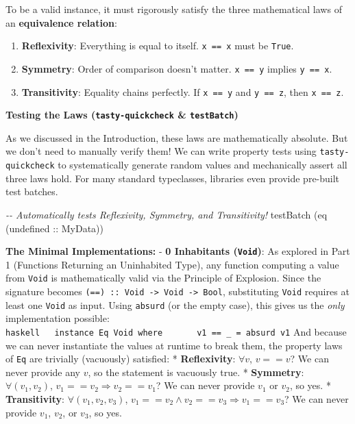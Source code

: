 \documentclass[
]{article}
\newenvironment{Shaded}{}{}
\newcommand{\CommentTok}[1]{\textcolor[rgb]{0.38,0.63,0.69}{\textit{#1}}}
\newcommand{\DataTypeTok}[1]{\textcolor[rgb]{0.56,0.13,0.00}{#1}}
\newcommand{\FunctionTok}[1]{\textcolor[rgb]{0.02,0.16,0.49}{#1}}
\newcommand{\NormalTok}[1]{#1}
\newcommand{\OtherTok}[1]{\textcolor[rgb]{0.00,0.44,0.13}{#1}}
\providecommand{\tightlist}{%
  \setlength{\itemsep}{0pt}\setlength{\parskip}{0pt}}
\begin{document}
To be a valid instance, it must rigorously satisfy the three
mathematical laws of an \textbf{equivalence relation}:

\begin{enumerate}
\def\labelenumi{\arabic{enumi}.}
\tightlist
\item
  \textbf{Reflexivity}: Everything is equal to itself. \texttt{x\ ==\ x}
  must be \texttt{True}.
\item
  \textbf{Symmetry}: Order of comparison doesn't matter.
  \texttt{x\ ==\ y} implies \texttt{y\ ==\ x}.
\item
  \textbf{Transitivity}: Equality chains perfectly. If \texttt{x\ ==\ y}
  and \texttt{y\ ==\ z}, then \texttt{x\ ==\ z}.
\end{enumerate}

\textbf{Testing the Laws (\texttt{tasty-quickcheck} \&
\texttt{testBatch})}

As we discussed in the Introduction, these laws are mathematically
absolute. But we don't need to manually verify them! We can write
property tests using \texttt{tasty-quickcheck} to systematically
generate random values and mechanically assert all three laws hold. For
many standard typeclasses, libraries even provide pre-built test
batches.

\begin{Shaded}
\begin{Highlighting}[]
\CommentTok{{-}{-} Automatically tests Reflexivity, Symmetry, and Transitivity!}
\NormalTok{testBatch (eq (}\FunctionTok{undefined}\OtherTok{ ::} \DataTypeTok{MyData}\NormalTok{))}
\end{Highlighting}
\end{Shaded}

\textbf{The Minimal Implementations:} - \textbf{0 Inhabitants
(\texttt{Void})}: As explored in Part 1 (Functions Returning an
Uninhabited Type), any function computing a value from \texttt{Void} is
mathematically valid via the Principle of Explosion. Since the signature
becomes
\texttt{(==)\ ::\ Void\ -\textgreater{}\ Void\ -\textgreater{}\ Bool},
substituting \texttt{Void} requires at least one \texttt{Void} as input.
Using \texttt{absurd} (or the empty case), this gives us the \emph{only}
implementation possible:
\texttt{haskell\ \ \ instance\ Eq\ Void\ where\ \ \ \ \ \ \ v1\ ==\ \_\ =\ absurd\ v1}
And because we can never instantiate the values at runtime to break
them, the property laws of \texttt{Eq} are trivially (vacuously)
satisfied: * \textbf{Reflexivity}: \(\forall v\), \(v == v\)? We can
never provide any \(v\), so the statement is vacuously true. *
\textbf{Symmetry}: \(\forall (v_1, v_2)\),
\(v_1 == v_2 \Rightarrow v_2 == v_1\)? We can never provide \(v_1\) or
\(v_2\), so yes. * \textbf{Transitivity}: \(\forall (v_1, v_2, v_3)\),
\(v_1 == v_2 \land v_2 == v_3 \Rightarrow v_1 == v_3\)? We can never
provide \(v_1\), \(v_2\), or \(v_3\), so yes.
\end{document}
